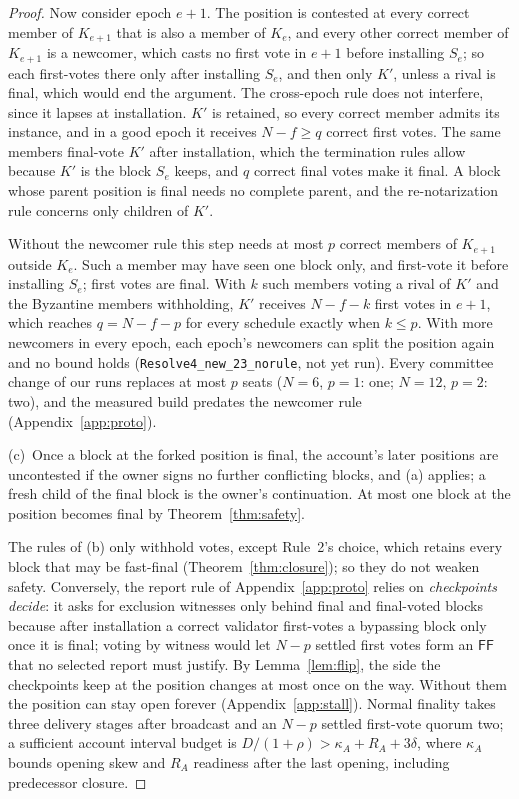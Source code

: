 \documentclass[conference]{IEEEtran}
\newcommand{\FF}{\mathsf{FF}}
\begin{document}
\begin{proof}
Now consider epoch $e+1$. The position is contested at every correct member of $K_{e+1}$ that is also a member of $K_e$, and every other correct member of $K_{e+1}$ is a newcomer, which casts no first vote in $e+1$ before installing $S_e$; so each first-votes there only after installing $S_e$, and then only $K'$, unless a rival is final, which would end the argument. The cross-epoch rule does not interfere, since it lapses at installation. $K'$ is retained, so every correct member admits its instance, and in a good epoch it receives $N-f\ge q$ correct first votes. The same members final-vote $K'$ after installation, which the termination rules allow because $K'$ is the block $S_e$ keeps, and $q$ correct final votes make it final. A block whose parent position is final needs no complete parent, and the re-notarization rule concerns only children of $K'$.

Without the newcomer rule this step needs at most $p$ correct members of $K_{e+1}$ outside $K_e$. Such a member may have seen one block only, and first-vote it before installing $S_e$; first votes are final. With $k$ such members voting a rival of $K'$ and the Byzantine members withholding, $K'$ receives $N-f-k$ first votes in $e+1$, which reaches $q=N-f-p$ for every schedule exactly when $k\le p$. With more newcomers in every epoch, each epoch's newcomers can split the position again and no bound holds (\texttt{Resolve4\_new\_23\_norule}, not yet run). Every committee change of our runs replaces at most $p$ seats ($N=6$, $p=1$: one; $N=12$, $p=2$: two), and the measured build predates the newcomer rule (Appendix~\ref{app:proto}).

(c)~Once a block at the forked position is final, the account's later positions are uncontested if the owner signs no further conflicting blocks, and (a) applies; a fresh child of the final block is the owner's continuation. At most one block at the position becomes final by Theorem~\ref{thm:safety}.

The rules of (b) only withhold votes, except Rule~2's choice, which retains every block that may be fast-final (Theorem~\ref{thm:closure}); so they do not weaken safety. Conversely, the report rule of Appendix~\ref{app:proto} relies on \emph{checkpoints decide}: it asks for exclusion witnesses only behind final and final-voted blocks because after installation a correct validator first-votes a bypassing block only once it is final; voting by witness would let $N-p$ settled first votes form an $\FF$ that no selected report must justify. By Lemma~\ref{lem:flip}, the side the checkpoints keep at the position changes at most once on the way. Without them the position can stay open forever (Appendix~\ref{app:stall}). Normal finality takes three delivery stages after broadcast and an $N-p$ settled first-vote quorum two; a sufficient account interval budget is $D/(1+\rho)>\kappa_A+R_A+3\delta$, where $\kappa_A$ bounds opening skew and $R_A$ readiness after the last opening, including predecessor closure.
\end{proof}
\end{document}
